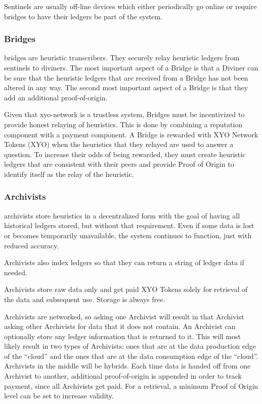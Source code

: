 \documentclass{article}
\begin{document}
Sentinels are usually off-line devices which either periodically go online or require \Glspl{bridge} to have their ledgers be part of the system.

\subsubsection {Bridges}
\Glspl{bridge} are \gls{heuristic} transcribers. They securely relay heuristic ledgers from \Glspl{sentinel} to \Glspl{diviner}. The most important aspect of a Bridge is that a Diviner can be sure that the heuristic ledgers that are received from a Bridge has not been altered in any way. The second most important aspect of a Bridge is that they add an additional \Gls{proof-of-origin}.

Given that \Gls{xyo-network} is a trustless system, Bridges must be incentivized to provide honest relaying of heuristics. This is done by combining a reputation component with a payment component. A Bridge is rewarded with XYO Network Tokens (XYO) when the heuristics that they relayed are used to answer a question. To increase their odds of being rewarded, they must create heuristic ledgers that are consistent with their peers and provide Proof of Origin to identify itself as the relay of the heuristic.

\subsubsection {Archivists}
\Glspl{archivist} store \glspl{heuristic} in a decentralized form with the goal of having all historical ledgers stored, but without that requirement. Even if some data is lost or becomes temporarily unavailable, the system continues to function, just with reduced \gls{accuracy}.

Archivists also index ledgers so that they can return a string of ledger data if needed.

Archivists store raw data only and get paid XYO Tokens solely for retrieval of the data and subsequent use. Storage is always free.

Archivists are networked, so asking one Archivist will result in that Archivist asking other Archivists for data that it does not contain. An Archivist can optionally store any ledger information that is returned to it. This will most likely result in two types of Archivists: ones that are at the data production edge of the ``cloud'' and the ones that are at the data consumption edge of the ``cloud''. Archivists in the middle will be hybrids. Each time data is handed off from one Archivist to another, additional \Gls{proof-of-origin} is appended in order to track payment, since all Archivists get paid. For a retrieval, a minimum Proof of Origin level can be set to increase validity.
\end{document}
